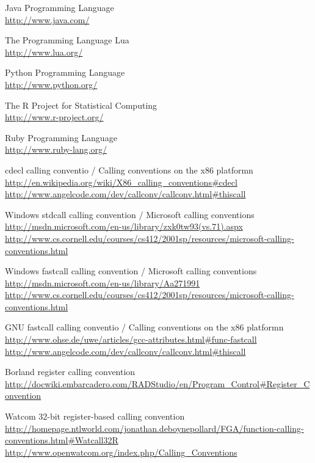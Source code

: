\begin{thebibliography}{14}
	Java Programming Language\\
	\url{http://www.java.com/}

	The Programming Language Lua\\
	\url{http://www.lua.org/}

	Python Programming Language\\
	\url{http://www.python.org/}

	The R Project for Statistical Computing\\
	\url{http://www.r-project.org/}

	Ruby Programming Language\\
	\url{http://www.ruby-lang.org/}

	cdecl calling conventio / Calling conventions on the x86 platformn\\
	\url{http://en.wikipedia.org/wiki/X86_calling_conventions#cdecl}\\
	\url{http://www.angelcode.com/dev/callconv/callconv.html#thiscall}

	Windows stdcall calling convention / Microsoft calling conventions\\
	\url{http://msdn.microsoft.com/en-us/library/zxk0tw93(vs.71).aspx}\\
	\url{http://www.cs.cornell.edu/courses/cs412/2001sp/resources/microsoft-calling-conventions.html}

	Windows fastcall calling convention / Microsoft calling conventions\\
	\url{http://msdn.microsoft.com/en-us/library/Aa271991}\\
	\url{http://www.cs.cornell.edu/courses/cs412/2001sp/resources/microsoft-calling-conventions.html}

	GNU fastcall calling conventio / Calling conventions on the x86 platformn\\
	\url{http://www.ohse.de/uwe/articles/gcc-attributes.html#func-fastcall}\\
	\url{http://www.angelcode.com/dev/callconv/callconv.html#thiscall}

	Borland register calling convention\\
	\url{http://docwiki.embarcadero.com/RADStudio/en/Program_Control#Register_Convention}

	Watcom 32-bit register-based calling convention\\
	\url{http://homepage.ntlworld.com/jonathan.deboynepollard/FGA/function-calling-conventions.html#Watcall32R}
	\url{http://www.openwatcom.org/index.php/Calling_Conventions}


\end{thebibliography}
